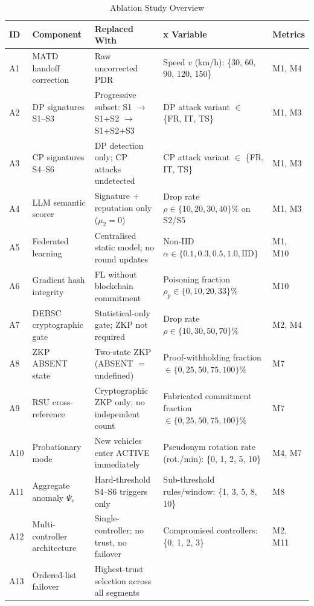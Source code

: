 \documentclass[12pt, a4paper]{report}
\begin{document}
\begin{table}[!htbp]
\renewcommand{\arraystretch}{1.2}
\caption{Ablation Study Overview}
\label{tab:ablation_summary}
\centering
\scriptsize
\begin{tabular}{|p{0.45cm}|p{2.4cm}|p{3.0cm}|p{3.3cm}|p{1.5cm}|}
\hline
\textbf{ID} &
\textbf{Component} &
\textbf{Replaced With} &
\textbf{x Variable} &
\textbf{Metrics} \\
\hline
A1 &
MATD handoff correction &
Raw uncorrected PDR &
Speed $v$ (km/h): \{30, 60, 90, 120, 150\} &
M1, M4 \\
\hline
A2 &
DP signatures S1--S3 &
Progressive subset: S1 $\to$ S1+S2 $\to$ S1+S2+S3 &
DP attack variant $\in$ \{FR, IT, TS\} &
M1, M3 \\
\hline
A3 &
CP signatures S4--S6 &
DP detection only; CP attacks undetected &
CP attack variant $\in$ \{FR, IT, TS\} &
M1, M3 \\
\hline
A4 &
LLM semantic scorer &
Signature $+$ reputation only ($\mu_2 = 0$) &
Drop rate $\rho \in \{10, 20, 30, 40\}\%$ on S2/S5 &
M1, M3 \\
\hline
A5 &
Federated learning &
Centralised static model; no round updates &
Non-IID $\alpha \in \{0.1, 0.3, 0.5, 1.0, \text{IID}\}$ &
M1, M10 \\
\hline
A6 &
Gradient hash integrity &
FL without blockchain commitment &
Poisoning fraction $\rho_p \in \{0, 10, 20, 33\}\%$ &
M10 \\
\hline
A7 &
DEBSC cryptographic gate &
Statistical-only gate; ZKP not required &
Drop rate $\rho \in \{10, 30, 50, 70\}\%$ &
M2, M4 \\
\hline
A8 &
ZKP ABSENT state &
Two-state ZKP (ABSENT $=$ undefined) &
Proof-withholding fraction $\in \{0, 25, 50, 75, 100\}\%$ &
M7 \\
\hline
A9 &
RSU cross-reference &
Cryptographic ZKP only; no independent count &
Fabricated commitment fraction $\in \{0, 25, 50, 75, 100\}\%$ &
M7 \\
\hline
A10 &
Probationary mode &
New vehicles enter ACTIVE immediately &
Pseudonym rotation rate (rot./min): \{0, 1, 2, 5, 10\} &
M4, M7 \\
\hline
A11 &
Aggregate anomaly $\Psi_c$ &
Hard-threshold S4--S6 triggers only &
Sub-threshold rules/window: \{1, 3, 5, 8, 10\} &
M8 \\
\hline
A12 &
Multi-controller architecture &
Single-controller; no trust, no failover &
Compromised controllers: \{0, 1, 2, 3\} &
M2, M11 \\
\hline
A13 &
Ordered-list failover &
Highest-trust selection across all segments &

\end{tabular}
\end{table}
\end{document}
